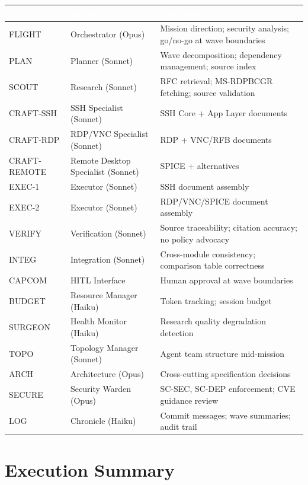\documentclass[11pt,letterpaper]{article}
\newcommand{\tableheader}[1]{\textbf{\sffamily\textcolor{white}{#1}}}
\begin{document}
\begin{center}
\begin{tabularx}{\textwidth}{L{2cm}L{3.5cm}X}
\toprule
{}
\tableheader{Role} & \tableheader{Agent} & \tableheader{Responsibility} \\
\midrule
FLIGHT & Orchestrator (Opus) & Mission direction; security analysis; go/no-go at wave boundaries \\
PLAN & Planner (Sonnet) & Wave decomposition; dependency management; source index \\
SCOUT & Research (Sonnet) & RFC retrieval; MS-RDPBCGR fetching; source validation \\
CRAFT-SSH & SSH Specialist (Sonnet) & SSH Core + App Layer documents \\
CRAFT-RDP & RDP/VNC Specialist (Sonnet) & RDP + VNC/RFB documents \\
CRAFT-REMOTE & Remote Desktop Specialist (Sonnet) & SPICE + alternatives \\
EXEC-1 & Executor (Sonnet) & SSH document assembly \\
EXEC-2 & Executor (Sonnet) & RDP/VNC/SPICE document assembly \\
VERIFY & Verification (Sonnet) & Source traceability; citation accuracy; no policy advocacy \\
INTEG & Integration (Sonnet) & Cross-module consistency; comparison table correctness \\
CAPCOM & HITL Interface & Human approval at wave boundaries \\
BUDGET & Resource Manager (Haiku) & Token tracking; session budget \\
SURGEON & Health Monitor (Haiku) & Research quality degradation detection \\
TOPO & Topology Manager (Sonnet) & Agent team structure mid-mission \\
ARCH & Architecture (Opus) & Cross-cutting specification decisions \\
SECURE & Security Warden (Opus) & SC-SEC, SC-DEP enforcement; CVE guidance review \\
LOG & Chronicle (Haiku) & Commit messages; wave summaries; audit trail \\
\bottomrule
\end{tabularx}
\end{center}

\section{Execution Summary}
\end{document}
